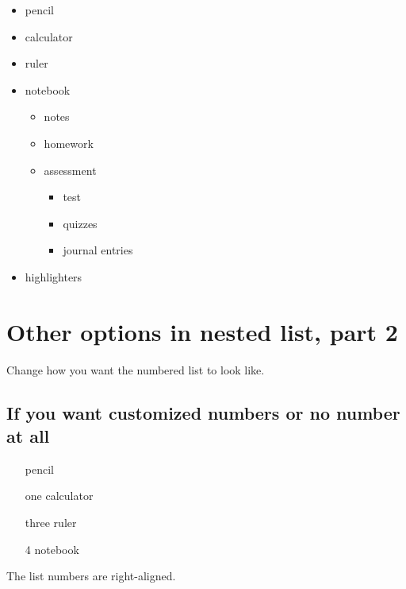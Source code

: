 \documentclass[11pt]{article}
\begin{document}
\begin{itemize}

\item pencil
\item calculator
\item ruler 
\item notebook
		\begin{itemize}
		\item notes
		\item homework
		\item assessment 
				\begin{itemize}
				\item test
				\item quizzes
				\item journal entries
				\end{itemize}
		\end{itemize}
\item highlighters

\end{itemize}


\section{Other options in nested list, part 2}

Change how you want the numbered list to look like. 

\subsection{If you want customized numbers or no number at all}

\begin{enumerate} [A.]

\item [] pencil
\item [one] calculator
\item [three] ruler 
\item [4] notebook

\end{enumerate}


The list numbers are right-aligned. 
\end{document}
